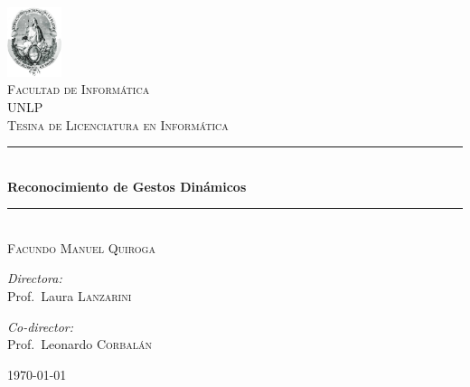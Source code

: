 
\begin{titlepage}
\begin{center}

\newcommand{\HRule}{\rule{\linewidth}{0.5mm}}

\includegraphics[width=0.12\textwidth]{img/unlp}~\\[1cm]

\textsc{\LARGE Facultad de Informática}\\[.5cm]
\textsc{\LARGE  UNLP}\\[1cm]

\textsc{\Large Tesina de Licenciatura en Informática}\\[0.5cm]

\HRule \\[0.4cm]
{ \huge \bfseries Reconocimiento de Gestos Dinámicos \\[0.4cm] }

\HRule \\[1.5cm]


\textsc{\Large Facundo Manuel Quiroga}\\[0.5cm]

\begin{minipage}{0.4\textwidth}
\begin{flushleft} \large
\emph{Directora:}\\
Prof.~Laura \textsc{Lanzarini}
\end{flushleft}
\end{minipage}
\begin{minipage}{0.5\textwidth}
\begin{flushright} \large
\emph{Co-director:} \\
Prof.~Leonardo \textsc{Corbalán}
\end{flushright}
\end{minipage}

\vfill

{\large \today}

\end{center}
\end{titlepage}

